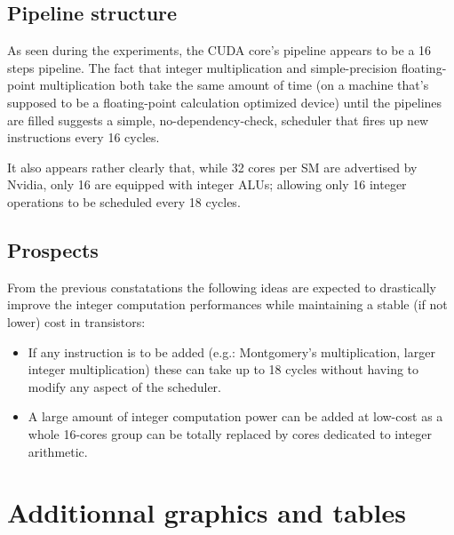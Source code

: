 \documentclass{report}
\begin{document}
    \subsection{Pipeline structure}
    As seen during the experiments, the CUDA core's pipeline appears to be a
    16 steps pipeline. The fact that integer multiplication and 
    simple-precision floating-point multiplication both take the same amount
    of time (on a machine that's supposed to be a floating-point calculation
    optimized device) until the pipelines are filled suggests a simple,
    no-dependency-check, scheduler that fires up new instructions every 16 cycles.

    It also appears rather clearly that, while 32 cores per SM are advertised by
    Nvidia, only 16 are equipped with integer ALUs; allowing only 16 integer
    operations to be scheduled every 18 cycles.
    
    \subsection{Prospects}
    From the previous constatations the following ideas are expected to drastically
    improve the integer computation performances while maintaining a stable (if not
    lower) cost in transistors:
    \begin{itemize}
        \item If any instruction is to be added (e.g.: Montgomery's multiplication, larger integer multiplication) these can take up to 18 cycles without having to modify any aspect of the scheduler.
        \item A large amount of integer computation power can be added at low-cost as a whole 16-cores group can be totally replaced by cores dedicated to integer arithmetic.
    \end{itemize}
\section{Additionnal graphics and tables}
\end{document}
